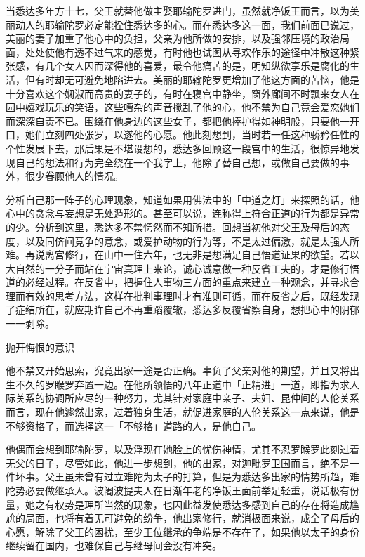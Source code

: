 \documentclass[12pt,twoside,openany]{book}
\begin{document}
当悉达多年方十七，父王就替他做主娶耶输陀罗进门，虽然就净饭王而言，以为美丽动人的耶输陀罗必定能拴住悉达多的心。而在悉达多这一面，我们前面已说过，美丽的妻子加重了他心中的负担，父亲为他所做的安排，以及强邻压境的政治局面，处处使他有透不过气来的感觉，有时他也试图从寻欢作乐的途径中冲散这种紧张感，有几个女人因而深得他的喜爱，最令他痛苦的是，明知纵欲享乐是腐化的生活，但有时却无可避免地陷进去。美丽的耶输陀罗更增加了他这方面的苦恼，他是十分喜欢这个娴淑而高贵的妻子的，有时在寝宫中静坐，窗外廊间不时飘来女人在园中嬉戏玩乐的笑语，这些嘈杂的声音搅乱了他的心，他不禁为自己竟会爱恋她们而深深自责不已。围绕在他身边的这些女子，都把他捧护得如神明般，只要他一开口，她们立刻四处张罗，以遂他的心愿。他此刻想到，当时若一任这种骄矜任性的个性发展下去，那后果是不堪设想的，悉达多回顾这一段宫中的生活，很惊异地发现自己的想法和行为完全绕在一个我字上，他除了替自己想，或做自己要做的事外，很少眷顾他人的情况。

分析自己那一阵子的心理现象，知道如果用佛法中的「中道之灯」来探照的话，他心中的贪念与妄想是无处遁形的。甚至可以说，连称得上符合正道的行为都是异常的少。分析到这里，悉达多不禁愕然而不知所措。回想当初他对父王及母后的态度，以及同侪间竞争的意念，或爱护动物的行为等，不是太过偏激，就是太强人所难。再说离宫修行，在山中一住六年，也无非是想满足自己悟道证果的欲望。若以大自然的一分子而站在宇宙真理上来论，诚心诚意做一种反省工夫的，才是修行悟道的必经过程。在反省中，把握住人事物三方面的重点来建立一种观念，并寻求合理而有效的思考方法，这样在批判事理时才有准则可循，而在反省之后，既经发现了症结所在，就应期许自己不再重蹈覆辙，悉达多反覆省察自身，想把心中的阴郁一一剥除。

抛开悔恨的意识

他不禁又开始思索，究竟出家一途是否正确。辜负了父亲对他的期望，并且又将出生不久的罗睺罗弃置一边。在他所领悟的八年正道中「正精进」一道，即指为求人际关系的协调所应尽的一种努力，尤其针对家庭中亲子、夫妇、昆仲间的人伦关系而言，现在他遽然出家，过着独身生活，就促进家庭的人伦关系这一点来说，他是不够资格了，而选择这一「不够格」道路的人，是他自己。

他偶而会想到耶输陀罗，以及浮现在她脸上的忧伤神情，尤其不忍罗睺罗此刻过着无父的日子，尽管如此，他进一步想到，他的出家，对迦毗罗卫国而言，绝不是一件坏事。父王虽未曾有过立难陀为太子的打算，但是为悉达多出家的情势所趋，难陀势必要做继承人。波阇波提夫人在日渐年老的净饭王面前举足轻重，说话极有份量，她之有权势是理所当然的现象，也因此益发使悉达多感到自己的存在将造成尴尬的局面，也将有着无可避免的纷争，他出家修行，就消极面来说，成全了母后的心愿，解除了父王的困扰，至少王位继承的争端是不存在了，如果他以太子的身份继续留在国内，也难保自己与继母间会没有冲突。
\end{document}

